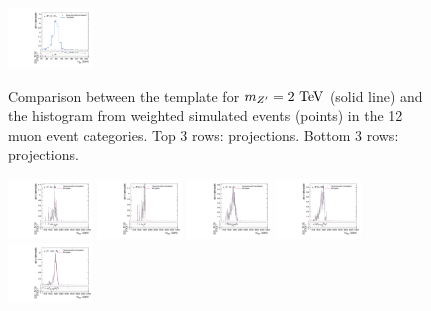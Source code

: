 \begin{figure}[htpb]
  \includegraphics[width=0.2\textwidth]{fig/2Dfit/templateVsReco_VBFZprToWW2000_r0_MJ_mu_LP_vbf_HDy.pdf}\\
  \caption{
    Comparison between the \VBF\ZprtoWW template for $m_{\Zpr}=2\unit{TeV}$ (solid line) and the histogram from weighted simulated events (points) in the 12 muon event categories.
    Top 3 rows: \MVV projections.
    Bottom 3 rows: \MJ projections.
  }
  \label{fig:1dtemplateVsReco_VBFZprToWW2000_Run2}
\end{figure}

\begin{figure}[htpb]
  \centering
  \includegraphics[width=0.2\textwidth]{fig/2Dfit/templateVsReco_VBFWprToWZ2000_r0_MVV_mu_HP_bb_LDy_linear.pdf}
  \includegraphics[width=0.2\textwidth]{fig/2Dfit/templateVsReco_VBFWprToWZ2000_r0_MVV_mu_LP_bb_LDy_linear.pdf}
  \includegraphics[width=0.2\textwidth]{fig/2Dfit/templateVsReco_VBFWprToWZ2000_r0_MVV_mu_HP_bb_HDy_linear.pdf}
  \includegraphics[width=0.2\textwidth]{fig/2Dfit/templateVsReco_VBFWprToWZ2000_r0_MVV_mu_LP_bb_HDy_linear.pdf}\\
  \includegraphics[width=0.2\textwidth]{fig/2Dfit/templateVsReco_VBFWprToWZ2000_r0_MVV_mu_HP_nobb_LDy_linear.pdf}

\end{figure}
